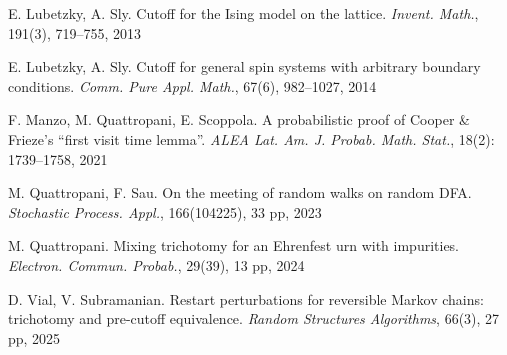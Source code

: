 \documentclass[11pt,oneside]{amsart}
\numberwithin{equation}{section}  %
\theoremstyle{plain}
\begin{document}
\begin{thebibliography}{}
	E. Lubetzky, A. Sly.
	\newblock Cutoff for the Ising model on the lattice.
{\em Invent. Math.}, 191(3), 719--755, 2013	
	
	E. Lubetzky, A. Sly.
\newblock Cutoff for general spin systems with arbitrary boundary conditions.
{\em Comm. Pure Appl. Math.}, 67(6), 982--1027, 2014

  
    F. Manzo, M. Quattropani, E. Scoppola.
\newblock A probabilistic proof of Cooper \& Frieze's ``first visit time lemma''.
{\em ALEA Lat. Am. J. Probab. Math. Stat.}, 18(2):  1739--1758, 2021

    M. Quattropani, F. Sau.
    \newblock On the meeting of random walks on random DFA.
    {\em Stochastic Process. Appl.}, 166(104225), 33 pp, 2023
    
    M. Quattropani.
\newblock Mixing trichotomy for an Ehrenfest urn with impurities.
 {\em Electron. Commun. Probab.},   29(39), 13 pp, 2024
     
    D. Vial, V. Subramanian.
    \newblock Restart perturbations for reversible Markov chains: trichotomy and pre-cutoff equivalence.
    {\em Random Structures Algorithms}, 66(3), 27 pp, 2025
  
\end{thebibliography}
\end{document}
